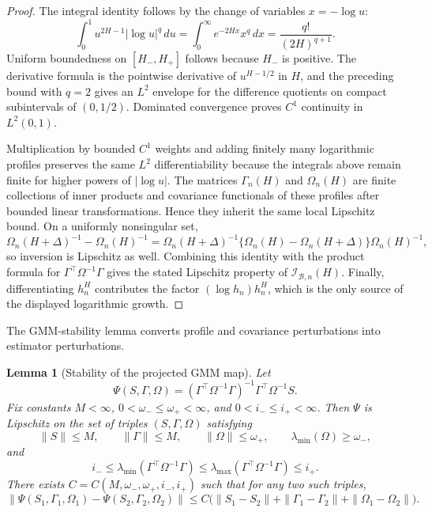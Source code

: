 \documentclass[11pt,a4paper]{amsart}
\theoremstyle{plain}
\newtheorem{lemma}[theorem]{Lemma}
\theoremstyle{definition}
\theoremstyle{remark}
\newcommand{\dd}{\,d}
\newcommand{\scrB}{\mathcal{B}}
\newcommand{\scrI}{\mathcal{I}}
\begin{document}
\begin{proof}
The integral identity follows by the change of variables \(x=-\log u\):
\[
        \int_0^1u^{2H-1}|\log u|^q\dd u
        =
        \int_0^\infty e^{-2Hx}x^q\dd x
        =
        \frac{q!}{(2H)^{q+1}} .
\]
Uniform boundedness on \([H_-,H_+]\) follows because \(H_-\) is positive.  The derivative formula is
the pointwise derivative of \(u^{H-1/2}\) in \(H\), and the preceding bound with \(q=2\) gives an
\(L^2\) envelope for the difference quotients on compact subintervals of \((0,1/2)\).  Dominated
convergence proves \(C^1\) continuity in \(L^2(0,1)\).

Multiplication by bounded \(C^1\) weights and adding finitely many logarithmic profiles preserves
the same \(L^2\) differentiability because the integrals above remain finite for higher powers of
\(|\log u|\).  The matrices \(\Gamma_n(H)\) and \(\Omega_n(H)\) are finite collections of inner
products and covariance functionals of these profiles after bounded linear transformations.  Hence
they inherit the same local Lipschitz bound.  On a uniformly nonsingular set,
\[
        \Omega_n(H+\Delta)^{-1}-\Omega_n(H)^{-1}
        =
        \Omega_n(H+\Delta)^{-1}
        \{\Omega_n(H)-\Omega_n(H+\Delta)\}
        \Omega_n(H)^{-1},
\]
so inversion is Lipschitz as well.  Combining this identity with the product formula for
\(\Gamma^\top\Omega^{-1}\Gamma\) gives the stated Lipschitz property of
\(\scrI_{\scrB,n}(H)\).  Finally, differentiating \(h_n^H\) contributes the factor
\((\log h_n)h_n^H\), which is the only source of the displayed logarithmic growth.
\end{proof}

The GMM-stability lemma converts profile and covariance perturbations into estimator perturbations.

\begin{lemma}[Stability of the projected GMM map]\label{lem:gmm-map-stability}
Let
\[
        \Psi(S,\Gamma,\Omega)
        =
        (\Gamma^\top\Omega^{-1}\Gamma)^{-1}
        \Gamma^\top\Omega^{-1}S.
\]
Fix constants \(M<\infty\), \(0<\omega_-\le \omega_+<\infty\), and \(0<i_-\le i_+<\infty\).  Then
\(\Psi\) is Lipschitz on the set of triples \((S,\Gamma,\Omega)\) satisfying
\[
        \|S\|\le M,\qquad \|\Gamma\|\le M,\qquad \|\Omega\|\le \omega_+,
        \qquad \lambda_{\min}(\Omega)\ge \omega_-,
\]
and
\[
        i_-\le \lambda_{\min}(\Gamma^\top\Omega^{-1}\Gamma)
        \le
        \lambda_{\max}(\Gamma^\top\Omega^{-1}\Gamma)\le i_+.
\]
There exists \(C=C(M,\omega_-,\omega_+,i_-,i_+)\) such that for any two such
triples,
\[
        \|\Psi(S_1,\Gamma_1,\Omega_1)-\Psi(S_2,\Gamma_2,\Omega_2)\|
        \le
        C\bigl(
        \|S_1-S_2\|
        +
        \|\Gamma_1-\Gamma_2\|
        +
        \|\Omega_1-\Omega_2\|
        \bigr).
\]
\end{lemma}
\end{document}
